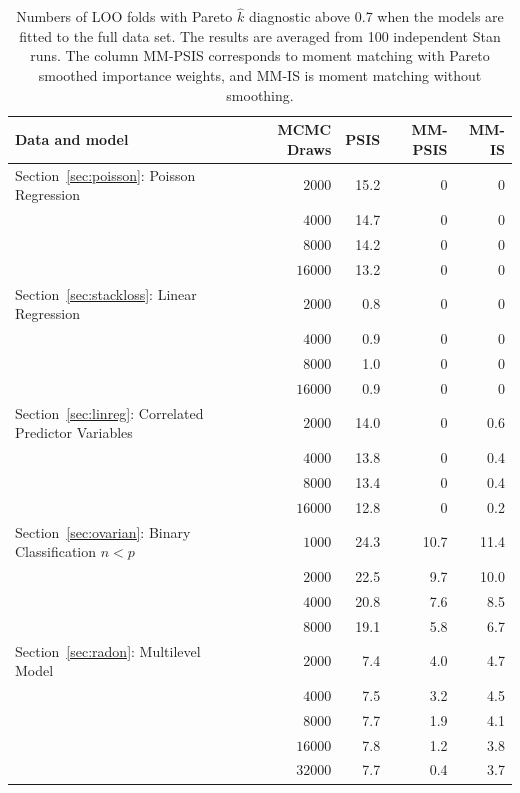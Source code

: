 \documentclass[12pt]{article}
\begin{document}
\begin{table}[t]
\centering
\caption{Numbers of LOO folds with Pareto $\hat{k}$ diagnostic above 0.7 when the models are fitted to the full data set. The results are averaged from 100 independent Stan runs. The column MM-PSIS corresponds to
moment matching with Pareto smoothed importance weights, and MM-IS
is moment matching without smoothing.}
\label{tab:results}
\begin{tabular}{ l r r r r }
\hline
Data and model & MCMC Draws & PSIS & MM-PSIS & MM-IS \\
\hline

                      
                      
%
Section~\ref{sec:poisson}: Poisson Regression & $2000$  & 15.2 & 0 & 0  \\
                                   & $4000$  & 14.7 & 0 & 0  \\
                                   & $8000$  & 14.2 & 0 & 0  \\
                                   & $16000$ & 13.2 & 0 & 0  \\
\hline                                    
%
Section~\ref{sec:stackloss}: Linear Regression & $2000$  & 0.8 & 0 & 0  \\
                                       & $4000$  & 0.9 & 0 & 0  \\
                                       & $8000$  & 1.0 & 0 & 0  \\
                                       & $16000$ & 0.9 & 0 & 0  \\
\hline                                    
%
Section~\ref{sec:linreg}: Correlated Predictor Variables       & $2000$  & 14.0 & 0      & 0.6 \\
                                   & $4000$  & 13.8 & 0      & 0.4 \\
                                   & $8000$  & 13.4 & 0      & 0.4 \\
                                   & $16000$ & 12.8 & 0      & 0.2 \\
%
\hline                                    
Section~\ref{sec:ovarian}: Binary Classification $n < p$ & $1000$  & 24.3 & 10.7 & 11.4  \\
                                      & $2000$  & 22.5 & 9.7 & 10.0  \\
                                      & $4000$  & 20.8 & 7.6 & 8.5  \\
                                      & $8000$  & 19.1 & 5.8 & 6.7  \\
\hline                               
%
Section~\ref{sec:radon}: Multilevel Model   & $2000$  & 7.4 & 4.0 & 4.7  \\
                                   & $4000$  & 7.5 & 3.2 & 4.5  \\
                                   & $8000$  & 7.7 & 1.9 & 4.1  \\
                                   & $16000$ & 7.8 & 1.2 & 3.8  \\
                                   & $32000$ & 7.7 & 0.4 & 3.7  \\
\hline
\end{tabular}
\end{table}
\end{document}
